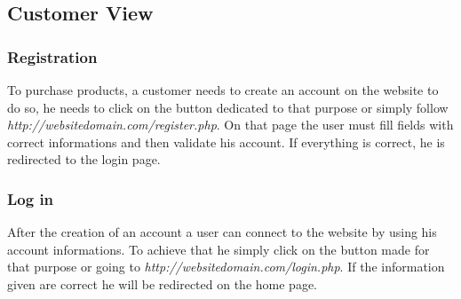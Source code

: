 \documentclass{article}
\begin{document}
\subsection{Customer View}

\subsubsection{Registration}
To purchase products, a customer needs to create an account on the website to do so, he needs to click on the button dedicated to that purpose or simply follow \textit{http://websitedomain.com/register.php}. On that page the user must fill fields with correct informations and then validate his account. If everything is correct, he is redirected to the login page.
 
\subsubsection{Log in}
After the creation of an account a user can connect to the website by using his account informations. To achieve that he simply click on the button made for that purpose or going to \textit{http://websitedomain.com/login.php}. If the information given are correct he will be redirected on the home page.
 
\end{document}
